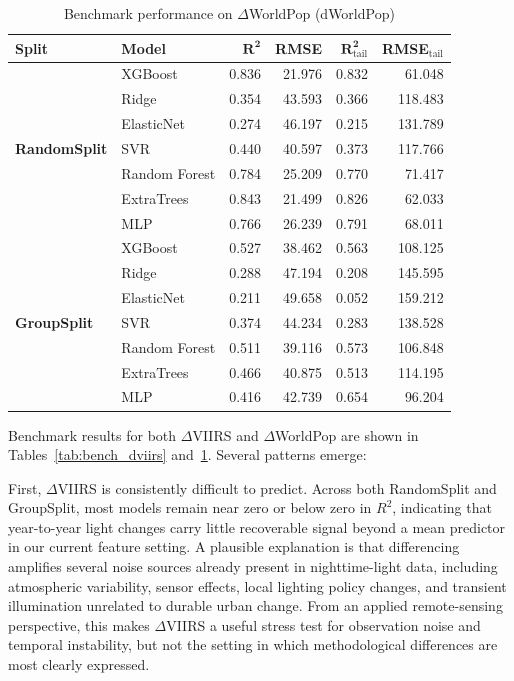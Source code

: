 \documentclass[preprint,12pt]{elsarticle}
\renewcommand{\arraystretch}{1.1}
\begin{document}
\begin{table}[htbp]
\centering
\scriptsize
\setlength{\tabcolsep}{3pt}
\renewcommand{\arraystretch}{1.05}
\caption{Benchmark performance on $\Delta$WorldPop (dWorldPop)}
\label{tab:bench_dworldpop}
\begin{tabular}{llrrrr}
\toprule
\textbf{Split} & \textbf{Model} & $\mathbf{R^2}$ & \textbf{RMSE} & $\mathbf{R^2_{\mathrm{tail}}}$ & \textbf{RMSE}$_{\mathrm{tail}}$ \\
\midrule
\multirow{7}{*}{\textbf{RandomSplit}} & XGBoost     & 0.836 & 21.976 & 0.832 &  61.048 \\
                            & Ridge       & 0.354 & 43.593 & 0.366 & 118.483 \\
                            & ElasticNet  & 0.274 & 46.197 & 0.215 & 131.789 \\
                            & SVR         & 0.440 & 40.597 & 0.373 & 117.766 \\
                            & Random Forest & 0.784 & 25.209 & 0.770 &  71.417 \\
                            & ExtraTrees  & 0.843 & 21.499 & 0.826 &  62.033 \\
                            & MLP         & 0.766 & 26.239 & 0.791 &  68.011 \\
\midrule
\multirow{7}{*}{\textbf{GroupSplit}} & XGBoost     & 0.527 & 38.462 & 0.563 & 108.125 \\
                            & Ridge       & 0.288 & 47.194 & 0.208 & 145.595 \\
                            & ElasticNet  & 0.211 & 49.658 & 0.052 & 159.212 \\
                            & SVR         & 0.374 & 44.234 & 0.283 & 138.528 \\
                            & Random Forest & 0.511 & 39.116 & 0.573 & 106.848 \\
                            & ExtraTrees  & 0.466 & 40.875 & 0.513 & 114.195 \\
                            & MLP         & 0.416 & 42.739 & 0.654 &  96.204 \\
\bottomrule
\end{tabular}
\end{table}

Benchmark results for both $\Delta$VIIRS and $\Delta$WorldPop are shown in Tables~\ref{tab:bench_dviirs} and~\ref{tab:bench_dworldpop}. Several patterns emerge:

First, $\Delta$VIIRS is consistently difficult to predict. Across both RandomSplit and GroupSplit, most models remain near zero or below zero in $R^2$, indicating that year-to-year light changes carry little recoverable signal beyond a mean predictor in our current feature setting. A plausible explanation is that differencing amplifies several noise sources already present in nighttime-light data, including atmospheric variability, sensor effects, local lighting policy changes, and transient illumination unrelated to durable urban change. From an applied remote-sensing perspective, this makes $\Delta$VIIRS a useful stress test for observation noise and temporal instability, but not the setting in which methodological differences are most clearly expressed.
\end{document}
